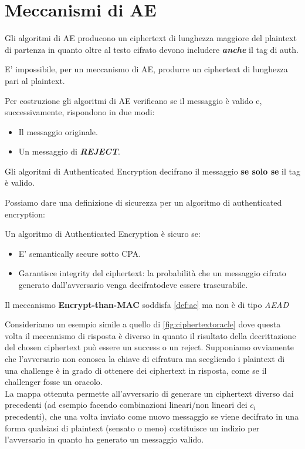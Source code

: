 \section{Meccanismi di AE}
Gli algoritmi di AE producono un ciphertext di lunghezza maggiore del plaintext di partenza in quanto oltre al testo cifrato devono includere \textbf{\textit{anche}} il tag di auth. 
\begin{remark}
E' impossibile, per un meccanismo di AE, produrre un ciphertext di lunghezza pari al plaintext.
\end{remark}
Per costruzione gli algoritmi di AE verificano se il messaggio è valido e, successivamente, rispondono in due modi:
\begin{itemize}
    \item [\textcolor{green}{\checkmark}] Il messaggio originale.
    \item [\textcolor{red}{\ding{55}}] Un messaggio di \textbf{\textit{REJECT}}.
\end{itemize}
\begin{proposition}
Gli algoritmi di Authenticated Encryption decifrano il messaggio \textbf{se solo se} il tag è valido.
\end{proposition}
Possiamo dare una definizione di sicurezza per un algoritmo di authenticated encryption:
\begin{definition}\label{def:ae}
Un algoritmo di Authenticated Encryption è sicuro se:
\begin{itemize}
    \item E' semantically secure sotto CPA.
    \item Garantisce integrity del ciphertext: la probabilità che un messaggio cifrato generato dall'avversario venga decifrato\footnotemark deve essere trascurabile. 
\end{itemize}
\end{definition}
\begin{remark}
Il meccanismo \textbf{Encrypt-than-MAC} soddisfa \cref{def:ae} ma non è di tipo \textit{AEAD}
\end{remark}
\begin{example}
Consideriamo un esempio simile a quello di \cref{fig:ciphertextoracle} dove questa volta il meccanismo di risposta è diverso in quanto il risultato della decrittazione del chosen ciphertext può essere un success o un reject. Supponiamo ovviamente che l'avversario non conosca la chiave di cifratura ma scegliendo i plaintext di una challenge è in grado di ottenere dei ciphertext in risposta, come se il challenger fosse un oracolo.\\
La mappa ottenuta permette all'avversario di generare un ciphertext diverso dai precedenti (ad esempio facendo combinazioni lineari/non lineari dei $c_i$ precedenti), che una volta inviato come nuovo messaggio se viene decifrato in una forma qualsiasi di plaintext (sensato o meno) costituisce un indizio per l'avversario in quanto ha generato un messaggio valido.
\end{example}
